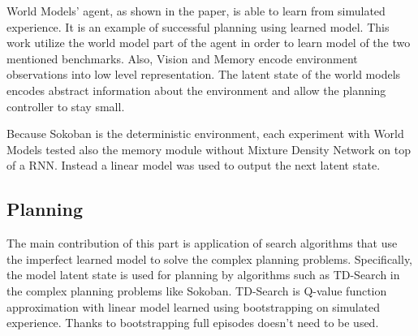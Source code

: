 World Models' agent, as shown in the paper\cite{Algo.WorldModels}, is able to learn from simulated experience. It is an example of successful planning using learned model. This work utilize the world model part of the agent in order to learn model of the two mentioned benchmarks. Also, Vision and Memory encode environment observations into low level representation. The latent state of the world models encodes abstract information about the environment and allow the planning controller to stay small.

Because Sokoban is the deterministic environment, each experiment with World Models tested also the memory module without Mixture Density Network on top of a RNN. Instead a linear model was used to output the next latent state.


\subsection{Planning}

The main contribution of this part is application of search algorithms that use the imperfect learned model to solve the complex planning problems. Specifically, the model latent state is used for planning by algorithms such as TD-Search in the complex planning problems like Sokoban. TD-Search is Q-value function approximation with linear model learned using bootstrapping on simulated experience. Thanks to bootstrapping full episodes doesn’t need to be used.
